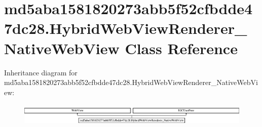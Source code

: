 \hypertarget{classmd5aba1581820273abb5f52cfbdde47dc28_1_1HybridWebViewRenderer__NativeWebView}{}\section{md5aba1581820273abb5f52cfbdde47dc28.\+Hybrid\+Web\+View\+Renderer\+\_\+\+Native\+Web\+View Class Reference}
\label{classmd5aba1581820273abb5f52cfbdde47dc28_1_1HybridWebViewRenderer__NativeWebView}
Inheritance diagram for md5aba1581820273abb5f52cfbdde47dc28.\+Hybrid\+Web\+View\+Renderer\+\_\+\+Native\+Web\+View\+:\begin{figure}[H]
\begin{center}
\leavevmode
\includegraphics[height=1.108911cm]{classmd5aba1581820273abb5f52cfbdde47dc28_1_1HybridWebViewRenderer__NativeWebView}
\end{center}
\end{figure}
